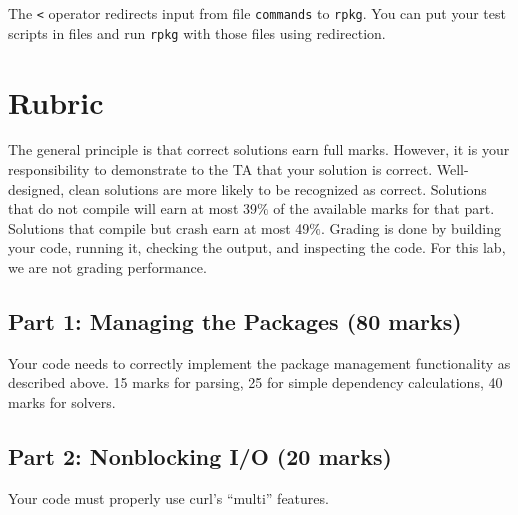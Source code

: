 \documentclass[12pt]{article}
\renewcommand{\_}{\kern-1.5pt\textunderscore\kern-1.5pt}
\begin{document}
\vspace{1em}
The \verb+<+ operator redirects input from file \texttt{commands} to \texttt{rpkg}. You can put your test scripts in files and run \texttt{rpkg} with those files using redirection.



\section*{Rubric}
The general principle is that correct solutions earn full marks. However, it is your responsibility to demonstrate to the TA that your solution is correct. Well-designed, clean solutions are more likely to be recognized as correct. Solutions that do not compile will earn at most 39$\%$  of the available marks for that part. Solutions that compile but crash earn at most 49$\%$. Grading is done by building your code, running it, checking the output, and inspecting the code. For this lab, we are not grading performance. \par

\subsection*{Part 1: Managing the Packages (80 marks) } Your code needs to correctly implement the package management functionality as described above. 15 marks for parsing, 25 for simple dependency calculations, 40 marks for solvers. \par

\subsection*{Part 2: Nonblocking I/O (20 marks) } Your code must properly use curl's ``multi''  features. \par %
\end{document}
